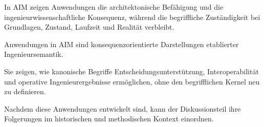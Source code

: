 \begin{principle}[Anwendungsprinzip]
\label{princ:application-principle}
In AIM zeigen Anwendungen die architektonische Befähigung und die
ingenieurwissenschaftliche Konsequenz, während die begriffliche
Zuständigkeit bei Grundlagen, Zustand, Laufzeit und Realität verbleibt.
\end{principle}

\begin{summary}
Anwendungen in AIM sind konsequenzorientierte Darstellungen etablierter
Ingenieursemantik.

Sie zeigen, wie kanonische Begriffe Entscheidungsunterstützung,
Interoperabilität und operative Ingenieurergebnisse ermöglichen, ohne den
begrifflichen Kernel neu zu definieren.
\end{summary}

Nachdem diese Anwendungen entwickelt sind, kann der Diskussionsteil ihre
Folgerungen im historischen und methodischen Kontext einordnen.
